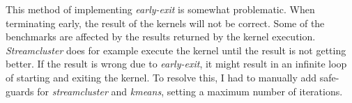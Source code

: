This method of implementing \textit{early-exit} is somewhat problematic. When terminating early, the result of the kernels will not be correct. Some of the benchmarks are affected by the results returned by the kernel execution. \textit{Streamcluster} does for example execute the kernel until the result is not getting better. If the result is wrong due to \textit{early-exit}, it might result in an infinite loop of starting and exiting the kernel. To resolve this, I had to manually add safe-guards for \textit{streamcluster} and \textit{kmeans}, setting a maximum number of iterations.





